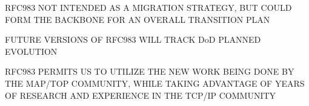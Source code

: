 \begin{bwslide}

\begin{nrtc}
\item	RFC983 NOT INTENDED AS A MIGRATION STRATEGY,
	BUT COULD FORM THE BACKBONE FOR AN OVERALL TRANSITION PLAN
\item	FUTURE VERSIONS OF RFC983 WILL TRACK DoD PLANNED EVOLUTION
\end{nrtc}
\end{bwslide}


\begin{bwslide}

\begin{nrtc}
\item	RFC983 PERMITS US TO UTILIZE THE NEW WORK
	BEING DONE BY THE MAP/TOP COMMUNITY,
	WHILE TAKING ADVANTAGE OF YEARS OF RESEARCH AND EXPERIENCE IN THE
	TCP/IP COMMUNITY
\end{nrtc}
\end{bwslide}



